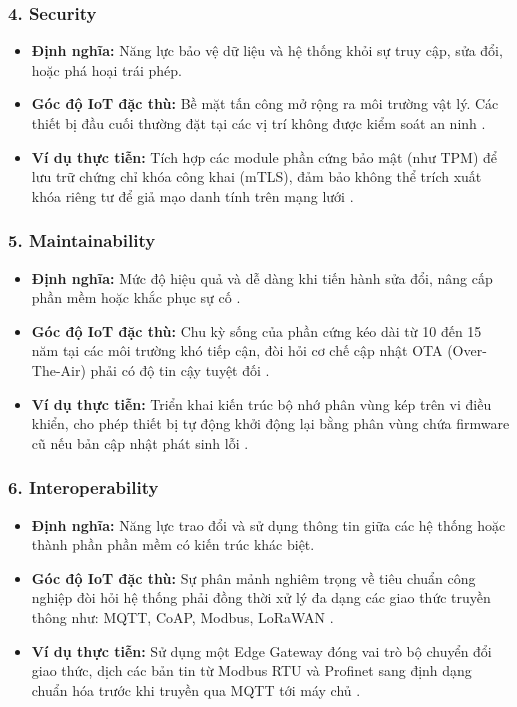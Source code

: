 \subsubsection*{4. Security}
\begin{itemize}
    \item \textbf{Định nghĩa:} Năng lực bảo vệ dữ liệu và hệ thống khỏi sự truy cập, sửa đổi, hoặc phá hoại trái phép.
    \item \textbf{Góc độ IoT đặc thù:} Bề mặt tấn công mở rộng ra môi trường vật lý. Các thiết bị đầu cuối thường đặt tại các vị trí không được kiểm soát an ninh \cite{lea2018}.
    \item \textbf{Ví dụ thực tiễn:} Tích hợp các module phần cứng bảo mật (như TPM) để lưu trữ chứng chỉ khóa công khai (mTLS), đảm bảo không thể trích xuất khóa riêng tư để giả mạo danh tính trên mạng lưới \cite{lea2018}.
\end{itemize}

\subsubsection*{5. Maintainability}
\begin{itemize}
    \item \textbf{Định nghĩa:} Mức độ hiệu quả và dễ dàng khi tiến hành sửa đổi, nâng cấp phần mềm hoặc khắc phục sự cố \cite{richards2020}.
    \item \textbf{Góc độ IoT đặc thù:} Chu kỳ sống của phần cứng kéo dài từ 10 đến 15 năm tại các môi trường khó tiếp cận, đòi hỏi cơ chế cập nhật OTA (Over-The-Air) phải có độ tin cậy tuyệt đối \cite{lea2018}.
    \item \textbf{Ví dụ thực tiễn:} Triển khai kiến trúc bộ nhớ phân vùng kép trên vi điều khiển, cho phép thiết bị tự động khởi động lại bằng phân vùng chứa firmware cũ nếu bản cập nhật phát sinh lỗi \cite{lea2018}.
\end{itemize}

\subsubsection*{6. Interoperability}
\begin{itemize}
    \item \textbf{Định nghĩa:} Năng lực trao đổi và sử dụng thông tin giữa các hệ thống hoặc thành phần phần mềm có kiến trúc khác biệt.
    \item \textbf{Góc độ IoT đặc thù:} Sự phân mảnh nghiêm trọng về tiêu chuẩn công nghiệp đòi hỏi hệ thống phải đồng thời xử lý đa dạng các giao thức truyền thông như: MQTT, CoAP, Modbus, LoRaWAN \cite{lea2018}.
    \item \textbf{Ví dụ thực tiễn:} Sử dụng một Edge Gateway đóng vai trò bộ chuyển đổi giao thức, dịch các bản tin từ Modbus RTU và Profinet sang định dạng chuẩn hóa trước khi truyền qua MQTT tới máy chủ \cite{aws_siemens2019}.
\end{itemize}

